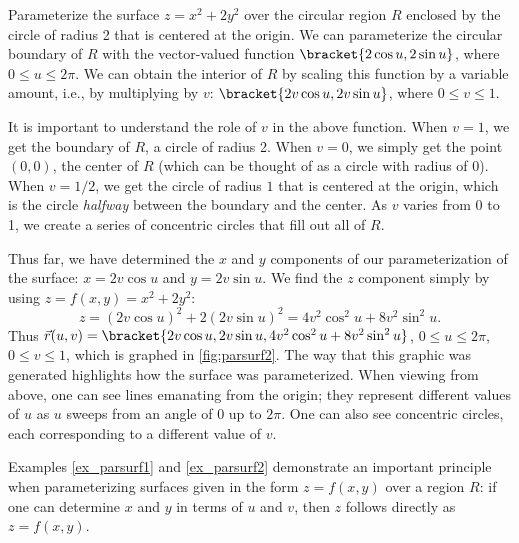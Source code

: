 \begin{example}\label{ex_parsurf2}
Parameterize the surface $z=x^2+2y^2$ over the circular region $R$ enclosed by the circle of radius 2 that is centered at the origin.
\solution
We can parameterize the circular boundary of $R$ with the vector-valued function $\bracket{2\cos u,2\sin u}$, where $0\leq u\leq 2\pi$. We can obtain the interior of $R$ by scaling this function by a variable amount, i.e., by multiplying by $v$: $\bracket{2v\cos u,2v\sin u}$, where $0\leq v\leq 1$.


It is important to understand the role of $v$ in the above function. When $v=1$, we get the boundary of $R$, a circle of radius 2. When $v=0$, we simply get the point $(0,0)$, the center of $R$ (which can be thought of as a circle with radius of 0). When $v=1/2$, we get the circle of radius $1$ that is centered at the origin, which is the circle \emph{halfway} between the boundary and the center. As $v$ varies from 0 to 1, we create a series of concentric circles that fill out all of $R$.

Thus far, we have determined the $x$ and $y$ components of our parameterization of the surface: $x=2v\cos u$ and $y=2v\sin u$. We find the $z$ component simply by using $z = f(x,y) = x^2+2y^2$: 
\[z = (2v\cos u)^2+2(2v\sin u)^2 = 4v^2\cos^2u+8v^2\sin^2u.\]
Thus $\vec r(u,v) =\bracket{2v\cos u,2v\sin u,4v^2\cos^2u+8v^2\sin^2u}$, $0\leq u\leq 2\pi$, $0\leq v\leq 1$, which is graphed in \autoref{fig:parsurf2}. The way that this graphic was generated highlights how the surface was parameterized. When viewing from above, one can see lines emanating from the origin; they represent different values of $u$ as $u$ sweeps from an angle of 0 up to $2\pi$. One can also see concentric circles, each corresponding to a different value of $v$.
\end{example}

Examples \ref{ex_parsurf1} and \ref{ex_parsurf2} demonstrate an important principle when parameterizing surfaces given in the form $z=f(x,y)$ over a region $R$: if one can determine $x$ and $y$ in terms of $u$ and $v$, then $z$ follows directly as $z=f(x,y)$. 


